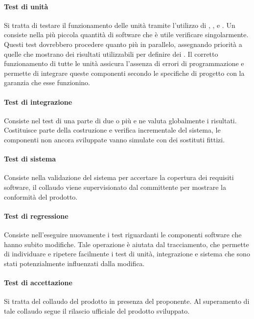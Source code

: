 			\paragraph{Test di unità}
			Si tratta di testare il funzionamento delle unità tramite l'utilizzo di , , e . Un  consiste nella più piccola quantità di software che è utile verificare singolarmente.
			 Questi test dovrebbero procedere quanto più in parallelo, assegnando priorità a quelle  che mostrano dei risultati utilizzabili per definire dei .
			 Il corretto funzionamento di tutte le unità assicura l'assenza di errori di programmazione e permette di integrare queste componenti secondo le specifiche di progetto con la garanzia che esse funzionino.
			 
			\paragraph{Test di integrazione}
			Consiste nel test di una parte di due o più  e ne valuta globalmente i risultati. Costituisce parte della costruzione e verifica incrementale del sistema, le  componenti non ancora sviluppate vanno simulate con dei sostituti fittizi.
			
			\paragraph{Test di sistema}
			Consiste nella validazione del sistema per accertare la copertura dei requisiti software, il collaudo viene supervisionato dal committente per mostrare la conformità del prodotto.			
			
			\paragraph{Test di regressione}
			Consiste nell'eseguire nuovamente i test riguardanti le componenti software che hanno subito modifiche.	Tale operazione è aiutata dal tracciamento, che permette di individuare e ripetere facilmente i test di unità, integrazione e sistema che sono stati potenzialmente influenzati dalla modifica.		
			
			\paragraph{Test di accettazione}
			Si tratta del collaudo del prodotto in presenza del proponente. Al superamento di tale collaudo segue il rilascio ufficiale del prodotto sviluppato.
			
